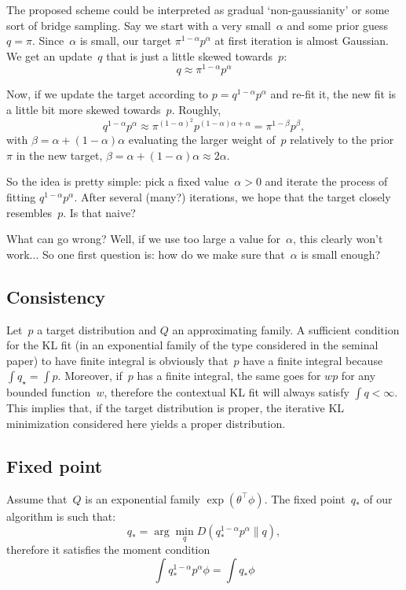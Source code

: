 \documentclass{article}
\begin{document}
The proposed scheme could be interpreted as gradual `non-gaussianity' or some sort of bridge sampling. Say we start with a very small~$\alpha$ and some prior guess~$q=\pi$. Since~$\alpha$ is small, our target $\pi^{1-\alpha}p^\alpha$ at first iteration is almost Gaussian. We get an update~$q$ that is just a little skewed towards~$p$:
$$
q \approx \pi^{1-\alpha} p^\alpha
$$

Now, if we update the target according to $p=q^{1-\alpha}p^\alpha$ and re-fit it, the new fit is a little bit more skewed towards~$p$. Roughly,
$$
q^{1-\alpha} p^\alpha 
\approx \pi^{(1-\alpha)^2} p^{(1-\alpha)\alpha + \alpha}
= \pi^{1-\beta} p^{\beta},
$$
with $\beta=\alpha+(1-\alpha)\alpha$ evaluating the larger weight of~$p$ relatively to the prior~$\pi$ in the new target, $\beta=\alpha+(1-\alpha)\alpha\approx 2\alpha$. 


So the idea is pretty simple: pick a fixed value~$\alpha>0$ and iterate the process of fitting $q^{1-\alpha}p^\alpha$. After several (many?) iterations, we hope that the target closely resembles~$p$. Is that naive? 

What can go wrong? Well, if we use too large a value for~$\alpha$, this clearly won't work... So one first question is: how do we make sure that~$\alpha$ is small enough? 

\subsection{Consistency}

Let~$p$ a target distribution and $Q$ an approximating family. A sufficient condition for the KL fit (in an exponential family of the type considered in the seminal paper) to have finite integral is obviously that~$p$ have a finite integral because $\int q_\star = \int p$. Moreover, if~$p$ has a finite integral, the same goes for $wp$ for any bounded function~$w$, therefore the contextual KL fit will always satisfy $\int q < \infty$. This implies that, if the target distribution is proper, the iterative KL minimization considered here yields a proper distribution.

\subsection{Fixed point}

Assume that~$Q$ is an exponential family $\exp(\theta^\top \phi)$. The fixed point~$q_*$ of our algorithm is such that:
$$
q_* = \arg\min_q D(q_*^{1-\alpha} p^\alpha \| q),
$$
therefore it satisfies the moment condition
$$
\int q_*^{1-\alpha}p^\alpha\phi 
= \int q_* \phi
$$
\end{document}
